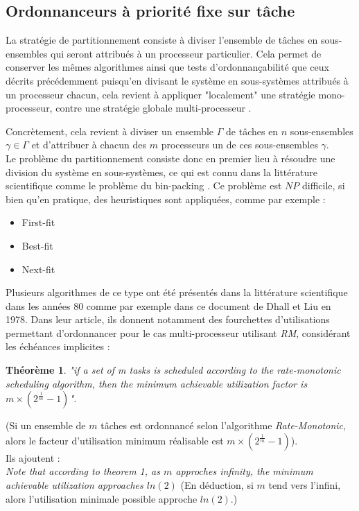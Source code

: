 \documentclass[11pt,a4paper,oneside]{report}
\newtheorem{mytheorem}{Théorème}
\begin{document}
\subsection{Ordonnanceurs à priorité fixe sur tâche}

La stratégie de partitionnement consiste à diviser l'ensemble de tâches en sous-ensembles qui seront 
attribués à un processeur particulier. Cela permet de conserver les mêmes algorithmes ainsi 
que tests d'ordonnançabilité que ceux 
décrits précédemment puisqu'en divisant le système en sous-systèmes attribués à un 
processeur chacun, cela revient à appliquer "localement" une stratégie mono-processeur, contre 
une stratégie globale multi-processeur \cite{ndoye_ordonnancement_2014}.

Concrètement, cela revient à diviser un ensemble $\Gamma$ de tâches en $n$ sous-ensembles 
$\gamma \in \Gamma$ et d'attribuer à chacun des $m$ processeurs un de ces sous-ensembles $\gamma$.\\


Le problème du partitionnement consiste donc en premier lieu 
à résoudre une division du système en sous-systèmes, ce qui est connu dans la 
littérature scientifique comme le problème du bin-packing \cite{ausiello_approximation_1984}.
Ce problème est $NP$ difficile, si bien qu'en pratique, 
des heuristiques sont appliquées, comme par exemple :\\
\begin{itemize}
	\item First-fit 
	\item Best-fit
	\item Next-fit
\end{itemize}

Plusieurs algorithmes de ce type ont été présentés dans la littérature scientifique
dans les années 80 comme par exemple \cite{dhall_real-time_1978} dans ce 
document de Dhall et Liu en 1978. 
Dans leur article, ils donnent notamment des fourchettes d'utilisations 
permettant d'ordonnancer pour le cas multi-processeur utilisant \textit{RM}, 
considérant les échéances implicites :
\begin{mytheorem}
\textit{"if a set of m tasks is scheduled according to the rate-monotonic scheduling algorithm, then the minimum achievable utilization factor is $m\times(2^{\frac{1}{m}} - 1)$".}
\end{mytheorem}
(Si un ensemble de $m$ tâches est ordonnancé selon l'algorithme \textit{Rate-Monotonic}, 
alors le facteur d'utilisation minimum réalisable est $m\times(2^{\frac{1}{m}} - 1)$). \\
Ils ajoutent :\\
\textit{Note that according to theorem 1, as $m$ approches infinity, 
	the minimum achievable utilization approaches $ln(2)$}
(En déduction, si $m$ tend vers l'infini, alors l'utilisation minimale possible approche $ln(2)$.) \\
\end{document}
